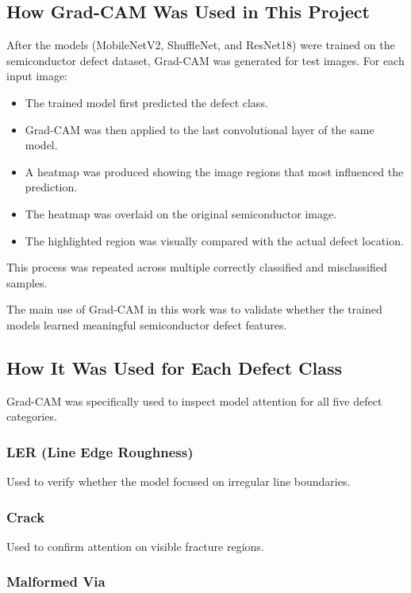 \subsection{How Grad-CAM Was Used in This Project}
After the models (MobileNetV2, ShuffleNet, and ResNet18) were trained on the semiconductor defect dataset, Grad-CAM was generated for test images.
For each input image:
\begin{itemize}
\item The trained model first predicted the defect class.
\item Grad-CAM was then applied to the last convolutional layer of the same model.
\item A heatmap was produced showing the image regions that most influenced the prediction.
\item The heatmap was overlaid on the original semiconductor image.
\item The highlighted region was visually compared with the actual defect location.
\end{itemize}
This process was repeated across multiple correctly classified and misclassified samples.

The main use of Grad-CAM in this work was to validate whether the trained models learned meaningful semiconductor defect features.

\subsection{How It Was Used for Each Defect Class}
Grad-CAM was specifically used to inspect model attention for all five defect categories.

\subsubsection{ LER (Line Edge Roughness)}

Used to verify whether the model focused on irregular line boundaries.

\subsubsection{Crack}

Used to confirm attention on visible fracture regions.

\subsubsection{Malformed Via}

